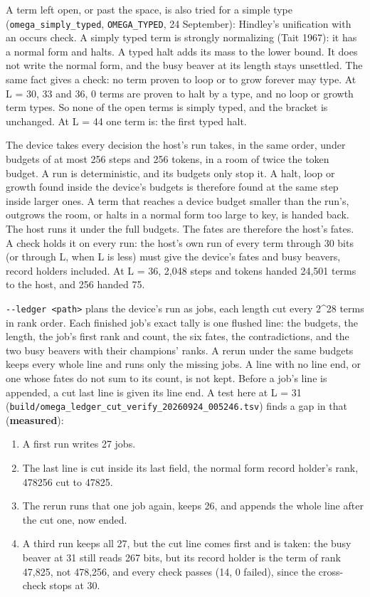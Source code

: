 A term left open, or past the space, is also tried for a simple type (\texttt{omega\_\allowbreak{}simply\_\allowbreak{}typed}, \texttt{OMEGA\_\allowbreak{}TYPED}, 24 September): Hindley's unification with an occurs check. A simply typed term is strongly normalizing (Tait 1967): it has a normal form and halts. A typed halt adds its mass to the lower bound. It does not write the normal form, and the busy beaver at its length stays unsettled. The same fact gives a check: no term proven to loop or to grow forever may type. At L = 30, 33 and 36, 0 terms are proven to halt by a type, and no loop or growth term types. So none of the open terms is simply typed, and the bracket is unchanged. At L = 44 one term is: the first typed halt.

The device takes every decision the host's run takes, in the same order, under budgets of at most 256 steps and 256 tokens, in a room of twice the token budget. A run is deterministic, and its budgets only stop it. A halt, loop or growth found inside the device's budgets is therefore found at the same step inside larger ones. A term that reaches a device budget smaller than the run's, outgrows the room, or halts in a normal form too large to key, is handed back. The host runs it under the full budgets. The fates are therefore the host's fates. A check holds it on every run: the host's own run of every term through 30 bits (or through L, when L is less) must give the device's fates and busy beavers, record holders included. At L = 36, 2,048 steps and tokens handed 24,501 terms to the host, and 256 handed 75.

\texttt{-\allowbreak{}-\allowbreak{}ledger <path>} plans the device's run as jobs, each length cut every 2\textasciicircum{}28 terms in rank order. Each finished job's exact tally is one flushed line: the budgets, the length, the job's first rank and count, the six fates, the contradictions, and the two busy beavers with their champions' ranks. A rerun under the same budgets keeps every whole line and runs only the missing jobs. A line with no line end, or one whose fates do not sum to its count, is not kept. Before a job's line is appended, a cut last line is given its line end. A test here at L = 31 (\texttt{build/\allowbreak{}omega\_\allowbreak{}ledger\_\allowbreak{}cut\_\allowbreak{}verify\_\allowbreak{}20260924\_\allowbreak{}005246.\allowbreak{}tsv}) finds a gap in that (\textbf{measured}):

\begin{enumerate}
\item A first run writes 27 jobs.
\item The last line is cut inside its last field, the normal form record holder's rank, 478256 cut to 47825.
\item The rerun runs that one job again, keeps 26, and appends the whole line after the cut one, now ended.
\item A third run keeps all 27, but the cut line comes first and is taken: the busy beaver at 31 still reads 267 bits, but its record holder is the term of rank 47,825, not 478,256, and every check passes (14, 0 failed), since the cross-check stops at 30.
\end{enumerate}

